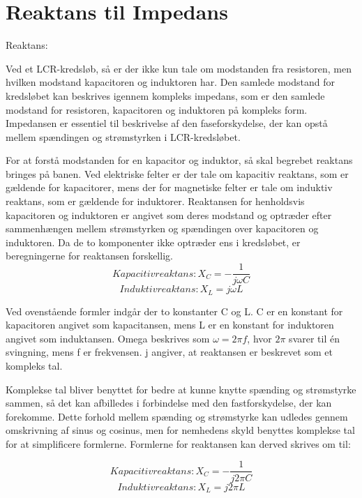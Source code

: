 \section{Reaktans til Impedans}
Reaktans:

Ved et LCR-kredsløb, så er der ikke kun tale om modstanden fra resistoren, men hvilken modstand kapacitoren og induktoren har. Den samlede modstand for kredsløbet kan beskrives igennem kompleks impedans, som er den samlede modstand for resistoren, kapacitoren og induktoren på kompleks form. Impedansen er essentiel til beskrivelse af den faseforskydelse, der kan opstå mellem spændingen og strømstyrken i LCR-kredsløbet.

For at forstå modstanden for en kapacitor og induktor, så skal begrebet reaktans bringes på banen. Ved elektriske felter er der tale om kapacitiv reaktans, som er gældende for kapacitorer, mens der for magnetiske felter er tale om induktiv reaktans, som er gældende for induktorer. Reaktansen for henholdsvis kapacitoren og induktoren er angivet som deres modstand og optræder efter sammenhængen mellem strømstyrken og spændingen over kapacitoren og induktoren. Da de to komponenter ikke optræder ens i kredsløbet, er beregningerne for reaktansen forskellig.
\begin{equation}
Kapacitiv reaktans: X_C = - \frac{1}{j \omega C}
\end{equation}
\begin{equation}
Induktiv reaktans: X_L = j \omega L
\end{equation}

Ved ovenstående formler indgår der to konstanter C og L. C er en konstant for kapacitoren angivet som kapacitansen, mens L er en konstant for induktoren angivet som induktansen. Omega beskrives som $\omega = 2 \pi f$, hvor $2 \pi$ svarer til én svingning, mens f er frekvensen. j angiver, at reaktansen er beskrevet som et kompleks tal.

Komplekse tal bliver benyttet for bedre at kunne knytte spænding og strømstyrke sammen, så det kan afbilledes i forbindelse med den fastforskydelse, der kan forekomme. Dette forhold mellem spænding og strømstyrke kan udledes gennem omskrivning af sinus og cosinus, men for nemhedens skyld benyttes komplekse tal for at simplificere formlerne. Formlerne for reaktansen kan derved skrives om til:

\begin{equation}
Kapacitiv reaktans: X_C = - \frac{1}{j 2 \pi C}
\end{equation}
\begin{equation}
Induktiv reaktans: X_L = j 2 \pi L
\end{equation}

